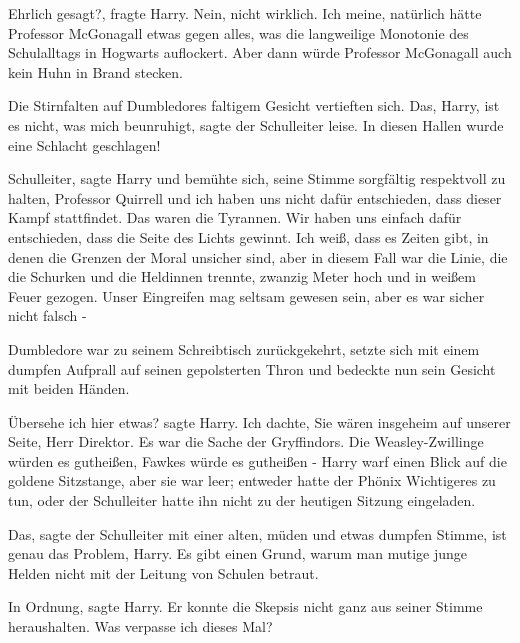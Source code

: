 \glqq{}Ehrlich gesagt?\grqq{}, fragte Harry. \glqq{}Nein, nicht wirklich. Ich
meine, natürlich hätte Professor McGonagall etwas gegen alles, was die
langweilige Monotonie des Schulalltags in Hogwarts auflockert. Aber dann würde
Professor McGonagall auch kein Huhn in Brand stecken.\grqq{}

Die Stirnfalten auf Dumbledores faltigem Gesicht vertieften sich. \glqq{}Das,
Harry, ist es nicht, was mich beunruhigt\grqq{}, sagte der Schulleiter leise.
\glqq{}In diesen Hallen wurde eine Schlacht geschlagen!\grqq{}

\glqq{}Schulleiter\grqq{}, sagte Harry und bemühte sich, seine Stimme sorgfältig
respektvoll zu halten, \glqq{}Professor Quirrell und ich haben uns nicht dafür
entschieden, dass dieser Kampf stattfindet. Das waren die Tyrannen. Wir haben
uns einfach dafür entschieden, dass die Seite des Lichts gewinnt. Ich weiß, dass
es Zeiten gibt, in denen die Grenzen der Moral unsicher sind, aber in diesem
Fall war die Linie, die die Schurken und die Heldinnen trennte, zwanzig Meter
hoch und in weißem Feuer gezogen. Unser Eingreifen mag seltsam gewesen sein,
aber es war sicher nicht falsch -\grqq{}

Dumbledore war zu seinem Schreibtisch zurückgekehrt, setzte sich mit einem
dumpfen Aufprall auf seinen gepolsterten Thron und bedeckte nun sein Gesicht mit
beiden Händen.

\glqq{}Übersehe ich hier etwas?\grqq{} sagte Harry. \glqq{}Ich dachte, Sie wären
insgeheim auf unserer Seite, Herr Direktor. Es war die Sache der Gryffindors.
Die Weasley-Zwillinge würden es gutheißen, Fawkes würde es gutheißen -\grqq{}
Harry warf einen Blick auf die goldene Sitzstange, aber sie war leer; entweder
hatte der Phönix Wichtigeres zu tun, oder der Schulleiter hatte ihn nicht zu der
heutigen Sitzung eingeladen.

\glqq{}Das\grqq{}, sagte der Schulleiter mit einer alten, müden und etwas dumpfen
Stimme, \glqq{}ist genau das Problem, Harry. Es gibt einen Grund, warum man
mutige junge Helden nicht mit der Leitung von Schulen betraut.\grqq{}

\glqq{}In Ordnung\grqq{}, sagte Harry. Er konnte die Skepsis nicht ganz aus
seiner Stimme heraushalten. \glqq{}Was verpasse ich dieses Mal?\grqq{}

